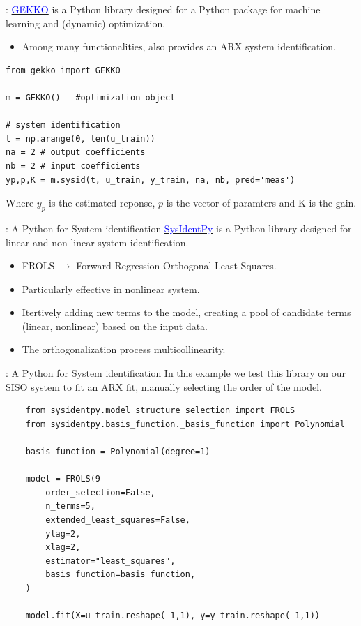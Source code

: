 \documentclass[aspectratio=169,hyperref={pdfpagelabels=false}]{beamer}
\begin{document}
\begin{frame}[fragile]{: }
  \href{https://github.com/BYU-PRISM/GEKKO}{\textcolor{blue}{GEKKO}} is a Python library designed for a Python package for machine learning and (dynamic) optimization.
\begin{itemize}
  \item Among many functionalities, also provides an ARX system identification. 
\end{itemize}
\vspace{1em}
\begin{verbatim}
from gekko import GEKKO

m = GEKKO()   #optimization object

# system identification
t = np.arange(0, len(u_train))
na = 2 # output coefficients
nb = 2 # input coefficients
yp,p,K = m.sysid(t, u_train, y_train, na, nb, pred='meas')
\end{verbatim}
Where $y_p$ is the estimated reponse, $p$ is the vector of paramters and K is the gain.
\end{frame}


\begin{frame}[fragile]{: A Python for System identification}
  \href{https://github.com/wilsonrljr/sysidentpy}{\textcolor{blue}{SysIdentPy}} is a Python library designed for linear and non-linear system identification.
\begin{itemize}
  \item FROLS $\rightarrow$ Forward Regression Orthogonal Least Squares.
  \item Particularly effective in nonlinear system. 
  \item Itertively adding new terms to the model, creating a pool of candidate terms (linear, nonlinear) based on the input data.
  \item The orthogonalization process multicollinearity.
\end{itemize}
\end{frame}

\begin{frame}[fragile]{: A Python for System identification}
  In this example we test this library on our SISO system to fit an ARX fit, manually selecting the order of the model.
  
  \begin{verbatim}
    from sysidentpy.model_structure_selection import FROLS
    from sysidentpy.basis_function._basis_function import Polynomial

    basis_function = Polynomial(degree=1)

    model = FROLS(9
        order_selection=False,
        n_terms=5,
        extended_least_squares=False,
        ylag=2,
        xlag=2,
        estimator="least_squares",
        basis_function=basis_function,
    )

    model.fit(X=u_train.reshape(-1,1), y=y_train.reshape(-1,1))
  \end{verbatim}
\end{frame}
\end{document}
